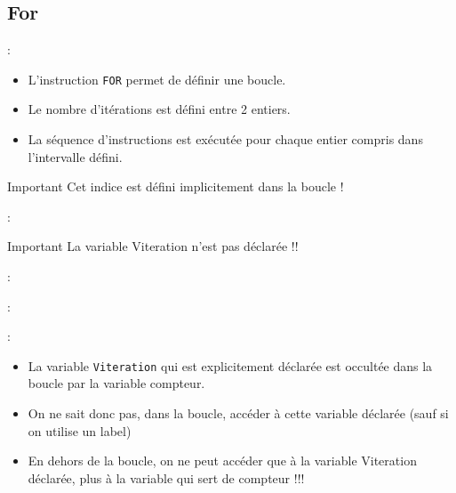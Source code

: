 \documentclass[10pt]{beamer}
\begin{document}
\subsection{For}
\begin{frame}{\secname : \subsecname}
    \begin{itemize}
        \item L'instruction \lstinline[language=plsql]!FOR! permet de définir une boucle.
        \item Le nombre d'itérations est défini entre 2 entiers.
        \item La séquence d'instructions est exécutée pour chaque entier compris dans l'intervalle défini.
    \end{itemize}
    \begin{alertblock}{Important}
        Cet indice est défini implicitement dans la boucle !
    \end{alertblock}
\end{frame}

\begin{frame}{\secname : \subsecname}
    
    \begin{alertblock}{Important}
        La variable Viteration n'est pas déclarée !!
    \end{alertblock}
\end{frame}

\begin{frame}{\secname : \subsecname}
    
\end{frame}

\begin{frame}{\secname : \subsecname}
    
\end{frame}

\begin{frame}{\secname : \subsecname}
    \begin{itemize}
        \item La variable \lstinline[language=plsql]!Viteration! qui est explicitement déclarée est occultée dans la boucle par la variable compteur.
        \item On ne sait donc pas, dans la boucle, accéder à cette variable déclarée (sauf si on utilise un label)
        \item En dehors de la boucle, on ne peut accéder que à la variable Viteration déclarée, plus à la variable qui sert de compteur !!!
    \end{itemize}
\end{frame}


\end{document}
